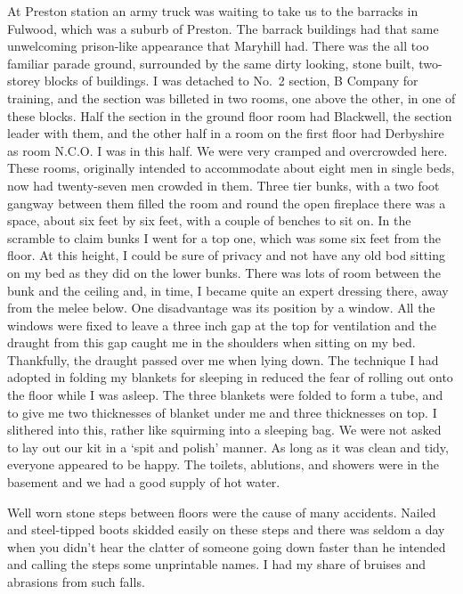At Preston station an army truck was waiting to take us to the
barracks in Fulwood, which was a suburb of Preston. The barrack
buildings had that same unwelcoming prison-like appearance that
Maryhill had. There was the all too familiar parade ground,
surrounded by the same dirty looking, stone built, two-storey blocks
of buildings. I was detached to No.~2 section, B Company for training,
and the section was billeted in two rooms, one above the other, in one
of these blocks. Half the section in the ground floor room had
\corporal Blackwell, the section leader with them, and the other half
in a room on the first floor had \lcorporal Derbyshire as room
N.C.O. I was in this half. We were very cramped and overcrowded
here. These rooms, originally intended to accommodate about eight men
in single beds, now had twenty-seven men crowded in them. Three tier
bunks, with a two foot gangway between them filled the room and round
the open fireplace there was a space, about six feet by six feet, with
a couple of benches to sit on. In the scramble to claim bunks I went
for a top one, which was some six feet from the floor. At this height,
I could be sure of privacy and not have any old bod sitting on my bed
as they did on the lower bunks. There was lots of room between the
bunk and the ceiling and, in time, I became quite an expert dressing
there, away from the melee below. One disadvantage was its position by
a window. All the windows were fixed to leave a three inch gap at the
top for ventilation and the draught from this gap caught me in the
shoulders when sitting on my bed. Thankfully, the draught passed over
me when lying down. The technique I had adopted in folding my blankets
for sleeping in reduced the fear of rolling out onto the floor while I
was asleep. The three blankets were folded to form a tube, and to give
me two thicknesses of blanket under me and three thicknesses on top. I
slithered into this, rather like squirming into a sleeping bag. We
were not asked to lay out our kit in a `spit and polish' manner. As
long as it was clean and tidy, everyone appeared to be happy. The
toilets, ablutions, and showers were in the basement and we had a good
supply of hot water.

Well worn stone steps between floors were the cause of many
accidents. Nailed and steel-tipped boots skidded easily on these
steps and there was seldom a day when you didn't hear the clatter of
someone going down faster than he intended and calling the steps some
unprintable names. I had my share of bruises and abrasions from such
falls. 

